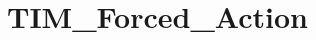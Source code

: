 \hypertarget{group___t_i_m___forced___action}{\section{T\-I\-M\-\_\-\-Forced\-\_\-\-Action}
\label{group___t_i_m___forced___action}
}
